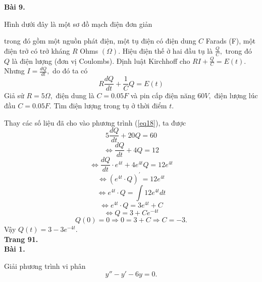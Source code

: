 \documentclass[12pt,a4paper]{article}
\begin{document}
\textbf{Bài 9.}
\begin{mybox}
Hình dưới đây là một sơ đồ mạch điện đơn giản
\begin{figure}[H]
\end{figure}
trong đó gồm một nguồn phát điện, một tụ điện có điện dung \(C\) Farads (F), một điện trở có trở kháng \(R\) Ohms \(\left( \Omega  \right).\) Hiệu điện thế ở hai đầu tụ là \(\frac{Q}{C},\) trong đó \(Q\) là điện lượng (đơn vị Coulombs). Định luật Kirchhoff cho \(RI + \frac{Q}{C} = E\left( t \right).\) Nhưng \(I = \frac{{dQ}}{{dt}},\) do đó ta có
\begin{equation}
R\frac{{dQ}}{{dt}} + \frac{1}{C}Q = E\left( t \right)
\label{eq18}
\end{equation}
Giả sử \(R = 5\Omega ,\) điện dung là \(C = 0.05F\) và pin cấp điện năng \(60V,\) điện lượng lúc đầu \(C = 0.05F.\) Tìm điện lượng trong tụ ở thời điểm \(t.\)
\end{mybox}
Thay các số liệu đã cho vào phương trình (\ref{eq18}), ta được
\[5\frac{{dQ}}{{dt}} + 20Q = 60\]
\[ \Leftrightarrow \frac{{dQ}}{{dt}} + 4Q = 12\]
\[ \Leftrightarrow \frac{{dQ}}{{dt}} \cdot {e^{4t}} + 4{e^{4t}}Q = 12{e^{4t}}\]
\[ \Leftrightarrow {\left( {{e^{4t}} \cdot Q} \right)^\prime } = 12{e^{4t}}\]
\[ \Leftrightarrow {e^{4t}} \cdot Q = \int {12{e^{4t}}dt} \]
\[ \Leftrightarrow {e^{4t}} \cdot Q = 3{e^{4t}} + C\]
\[ \Leftrightarrow Q = 3 + C{e^{ - 4t}}\]
\[Q\left( 0 \right) = 0 \Rightarrow 0 = 3 + C \Rightarrow C =  - 3.\]
Vậy \(Q\left( t \right) = 3 - 3{e^{ - 4t}}.\)\\
\textbf{Trang 91.}\\
\textbf{Bài 1.}
\begin{mybox}
Giải phương trình vi phân
\begin{equation}
\label{eq19}
y'' - y' - 6y = 0.
\end{equation}
\end{mybox}
\end{document}
